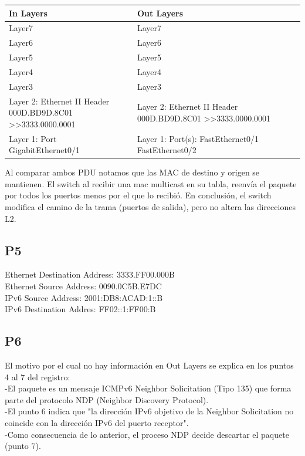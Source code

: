 \documentclass{article}
\begin{document}
\begin{tabular}{|l|l|}
\hline
In Layers & Out Layers \\
\hline
Layer7 & Layer7 \\
Layer6 & Layer6 \\
Layer5 & Layer5 \\
Layer4 & Layer4 \\
Layer3 & Layer3 \\
\makecell[l]{Layer 2: Ethernet II Header \\ 000D.BD9D.8C01 \textgreater\textgreater 3333.0000.0001} & \makecell[l]{Layer 2: Ethernet II Header \\ 000D.BD9D.8C01 \textgreater\textgreater 3333.0000.0001} \\
Layer 1: Port GigabitEthernet0/1 & Layer 1: Port(s): FastEthernet0/1 FastEthernet0/2 \\
\hline
\end{tabular}

Al comparar ambos PDU notamos que las MAC de destino y origen se mantienen. El switch al recibir una mac multicast en su tabla, reenvía el paquete por todos los puertos menos por el que lo recibió. En conclusión, el switch modifica el camino de la trama (puertos de salida), pero no altera las direcciones L2.

\subsection*{P5}

\text 
Ethernet Destination Address: 3333.FF00.000B\\
Ethernet Source Address: 0090.0C5B.E7DC\\
IPv6 Source Address: 2001:DB8:ACAD:1::B\\
IPv6 Destination Addres: FF02::1:FF00:B\\

\subsection*{P6}
El motivo por el cual no hay información en Out Layers se explica en los puntos 4 al 7 del registro: \\
\hspace{1cm}-El paquete es un mensaje ICMPv6 Neighbor Solicitation (Tipo 135) que forma parte del protocolo NDP (Neighbor Discovery Protocol).\\
\hspace{1cm}-El punto 6 indica que "la dirección IPv6 objetivo de la Neighbor Solicitation no coincide con la dirección IPv6 del puerto receptor".\\
\hspace{1cm}-Como consecuencia de lo anterior, el proceso NDP decide descartar el paquete (punto 7).\\
\end{document}
